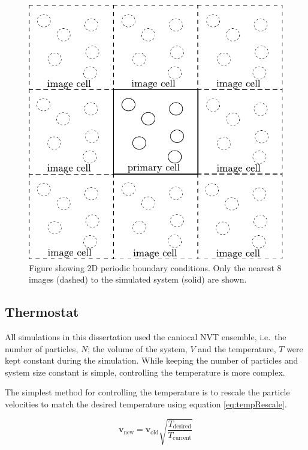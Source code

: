 \documentclass[12pt]{UoAthesis}
\begin{document}
\begin{figure}[htp] 
  \begin{center}
    \includegraphics[clip, scale = 0.8]{figures/PBC} 
    \caption{\label{fig:PBC} Figure showing 2D periodic boundary
      conditions. Only the nearest 8 images (dashed) to the simulated
      system (solid) are shown.}
  \end{center}
\end{figure}

\subsection{Thermostat}

All simulations in this dissertation used the caniocal NVT ensemble,
i.e.\ the number of particles, $N$; the volume of the system, $V$ and
the temperature, $T$ were kept constant during the simulation.  While
keeping the number of particles and system size constant is simple,
controlling the temperature is more complex.  

The simplest method for controlling the temperature is to rescale the
particle velocities to match the desired temperature using equation
\eqref{eq:tempRescale}. 

\begin{equation}
  \label{eq:tempRescale}
  \mathbf{v}_{\text{new}} = \mathbf{v}_{\text{old}} \sqrt{\frac{T_{\text{desired}}}{T_{\text{current}}}}
\end{equation}
\end{document}
